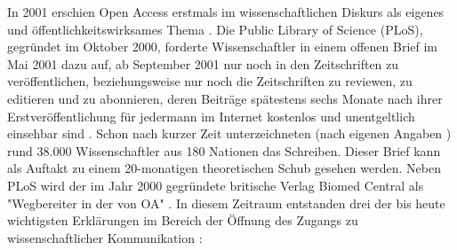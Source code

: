 In 2001 erschien Open Access erstmals im wissenschaftlichen Diskurs als eigenes und öffentlichkeitswirksames Thema \cite{cite:19}. Die Public Library of Science (PLoS), gegründet im Oktober 2000, forderte Wissenschaftler in einem offenen Brief im Mai 2001 dazu auf, ab September 2001 nur noch in den Zeitschriften zu veröffentlichen, beziehungsweise nur noch die Zeitschriften zu reviewen, zu editieren und zu abonnieren, deren Beiträge spätestens sechs Monate nach ihrer Erstveröffentlichung für jedermann im Internet kostenlos und unentgeltlich einsehbar sind \cite{cite:20}. Schon nach kurzer Zeit unterzeichneten (nach eigenen Angaben \cite{cite:19a}) rund 38.000 Wissenschaftler aus 180 Nationen das Schreiben. Dieser Brief kann als Auftakt zu einem 20-monatigen theoretischen Schub gesehen werden. Neben PLoS wird der im Jahr 2000 gegründete britische Verlag Biomed Central als "Wegbereiter in der von OA" \cite{suchen-Hoffmann-Zugang-undVerwertung-öffentlicher-Informationen}. In diesem Zeitraum entstanden drei der bis heute wichtigsten Erklärungen im Bereich der Öffnung des Zugangs zu wissenschaftlicher Kommunikation \cite{CREATe_2014}: 

